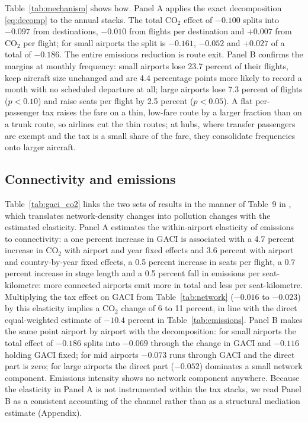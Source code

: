 Table~\ref{tab:mechanism} shows how. Panel A applies the exact decomposition \eqref{eq:decomp} to the
annual stacks. The total CO$_2$ effect of $-0.100$ splits into $-0.097$ from destinations, $-0.010$
from flights per destination and $+0.007$ from CO$_2$ per flight; for small airports the split is
$-0.161$, $-0.052$ and $+0.027$ of a total of $-0.186$. The entire emissions reduction is route exit.
Panel B confirms the margins at monthly frequency: small airports lose 23.7 percent of their flights,
keep aircraft size unchanged and are 4.4 percentage points more likely to record a month with no
scheduled departure at all; large airports lose 7.3 percent of flights ($p<0.10$) and raise seats per
flight by 2.5 percent ($p<0.05$). A flat per-passenger tax raises the fare on a thin, low-fare route by
a larger fraction than on a trunk route, so airlines cut the thin routes; at hubs, where transfer
passengers are exempt and the tax is a small share of the fare, they consolidate frequencies onto
larger aircraft.

\subsection{Connectivity and emissions}

Table~\ref{tab:gaci_co2} links the two sets of results in the manner of Table~9 in
\citet{li2019subway}, which translates network-density changes into pollution changes with the
estimated elasticity. Panel A estimates the within-airport elasticity of emissions to connectivity: a
one percent increase in GACI is associated with a 4.7 percent increase in CO$_2$ with airport and year
fixed effects and 3.6 percent with airport and country-by-year fixed effects, a 0.5 percent increase in
seats per flight, a 0.7 percent increase in stage length and a 0.5 percent fall in emissions per
seat-kilometre: more connected airports emit more in total and less per seat-kilometre. Multiplying
the tax effect on GACI from Table~\ref{tab:network} ($-0.016$ to $-0.023$) by this elasticity implies a
CO$_2$ change of 6 to 11 percent, in line with the direct equal-weighted estimate of $-10.4$ percent in
Table~\ref{tab:emissions}. Panel B makes the same point airport by airport with the
\citet{gelbach2016} decomposition: for small airports the total effect of $-0.186$ splits into $-0.069$
through the change in GACI and $-0.116$ holding GACI fixed; for mid airports $-0.073$ runs through
GACI and the direct part is zero; for large airports the direct part ($-0.052$) dominates a small
network component. Emissions intensity shows no network component anywhere. Because the elasticity
in Panel A is not instrumented within the tax stacks, we read Panel B as a consistent accounting of the
channel rather than as a structural mediation estimate (Appendix).

